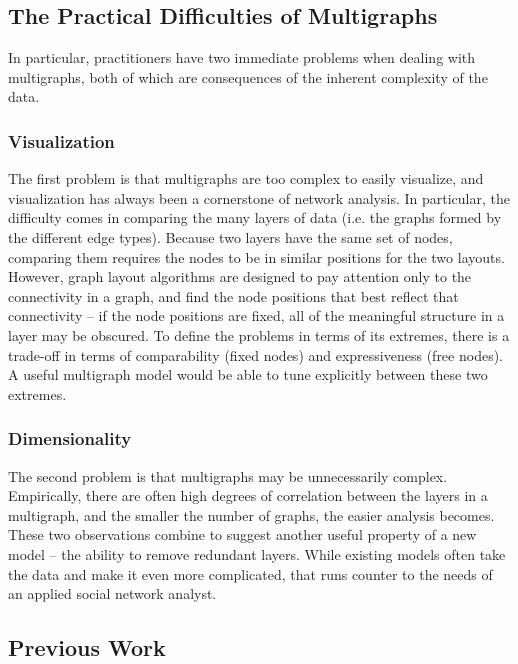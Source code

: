 \documentclass{article}
\begin{document}
\subsection{The Practical Difficulties of Multigraphs}
In particular, practitioners have two immediate problems when dealing with multigraphs, both of which are consequences of the inherent complexity of the data.

\subsubsection{Visualization}
The first problem is that multigraphs are too complex to easily visualize, and visualization has always been a cornerstone of network analysis. In particular, the difficulty comes in comparing the many layers of data (i.e. the graphs formed by the different edge types). Because two layers have the same set of nodes, comparing them requires the nodes to be in similar positions for the two layouts. However, graph layout algorithms are designed to pay attention only to the connectivity in a graph, and find the node positions that best reflect that connectivity -- if the node positions are fixed, all of the meaningful structure in a layer may be obscured. To define the problems in terms of its extremes, there is a trade-off in terms of comparability (fixed nodes) and expressiveness (free nodes). A useful multigraph model would be able to tune explicitly between these two extremes.

\subsubsection{Dimensionality}
The second problem is that multigraphs may be unnecessarily complex. Empirically, there are often high degrees of correlation between the layers in a multigraph, and the smaller the number of graphs, the easier analysis becomes. These two observations combine to suggest another useful property of a new model -- the ability to remove redundant layers. While existing models often take the data and make it even more complicated, that runs counter to the needs of an applied social network analyst.

\subsection{Previous Work}
\end{document}
